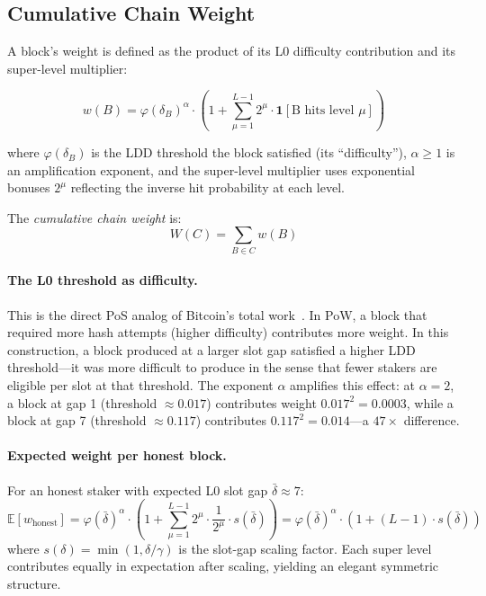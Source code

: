 \documentclass[11pt]{article}
\newcommand{\threshold}{\varphi}
\begin{document}
\subsection{Cumulative Chain Weight}
\label{sec:weight}

A block's weight is defined as the product of its L0 difficulty contribution and its super-level multiplier:

\begin{equation}
    w(B) = \threshold(\delta_B)^\alpha \cdot \left(1 + \sum_{\mu=1}^{L-1} 2^\mu \cdot \mathbf{1}[\text{B hits level } \mu]\right)
    \label{eq:weight}
\end{equation}

where $\threshold(\delta_B)$ is the LDD threshold the block satisfied (its ``difficulty''), $\alpha \geq 1$ is an amplification exponent, and the super-level multiplier uses exponential bonuses $2^\mu$ reflecting the inverse hit probability at each level.

The \emph{cumulative chain weight} is:
\begin{equation}
    W(C) = \sum_{B \in C} w(B)
\end{equation}

\paragraph{The L0 threshold as difficulty.} This is the direct PoS analog of Bitcoin's total work~\cite{backbone}. In PoW, a block that required more hash attempts (higher difficulty) contributes more weight. In this construction, a block produced at a larger slot gap satisfied a higher LDD threshold---it was more difficult to produce in the sense that fewer stakers are eligible per slot at that threshold. The exponent $\alpha$ amplifies this effect: at $\alpha = 2$, a block at gap 1 (threshold $\approx 0.017$) contributes weight $0.017^2 = 0.0003$, while a block at gap 7 (threshold $\approx 0.117$) contributes $0.117^2 = 0.014$---a $47\times$ difference.

\paragraph{Expected weight per honest block.} For an honest staker with expected L0 slot gap $\bar{\delta} \approx 7$:
\begin{equation}
    \mathbb{E}[w_{\text{honest}}] = \threshold(\bar{\delta})^{\alpha} \cdot \left(1 + \sum_{\mu=1}^{L-1} 2^\mu \cdot \frac{1}{2^\mu} \cdot s(\bar{\delta})\right) = \threshold(\bar{\delta})^{\alpha} \cdot \left(1 + (L-1) \cdot s(\bar{\delta})\right)
\end{equation}
where $s(\delta) = \min(1, \delta/\gamma)$ is the slot-gap scaling factor. Each super level contributes equally in expectation after scaling, yielding an elegant symmetric structure.
\end{document}
